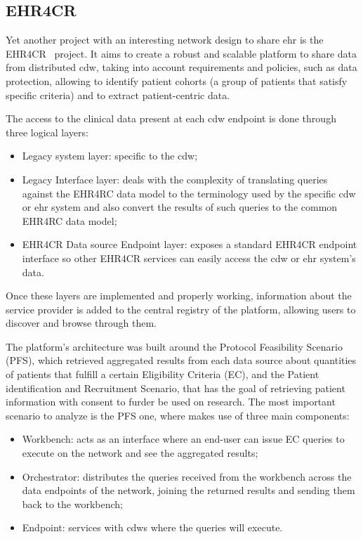 \subsection*{EHR4CR}
Yet another project with an interesting network design to share \gls{ehr} is the EHR4CR~\cite{ehr4cr} project.
It aims to create a robust and scalable platform to share data from distributed \gls{cdw}, taking into account requirements and policies, such as data protection, allowing to identify patient cohorts (a group of patients that satisfy specific criteria) and to extract patient-centric data.

The access to the clinical data present at each \gls{cdw} endpoint is done through three logical layers:
\begin{itemize}
    \item Legacy system layer: specific to the \gls{cdw};
    \item Legacy Interface layer: deals with the complexity of translating queries against the EHR4RC data model to the terminology used by the specific \gls{cdw} or \gls{ehr} system and also convert the results of such queries to the common EHR4RC data model;
    \item EHR4CR Data source Endpoint layer: exposes a standard EHR4CR endpoint interface so other EHR4CR services can easily access the \gls{cdw} or \gls{ehr} system's data.
\end{itemize}
Once these layers are implemented and properly working, information about the service provider is added to the central registry of the platform, allowing users to discover and browse through them.

The platform's architecture was built around the Protocol Feasibility Scenario (PFS), which retrieved aggregated results from each data source about quantities of patients that fulfill a certain Eligibility Criteria (EC), and the Patient identification and Recruitment Scenario, that has the goal of retrieving patient information with consent to furder be used on research.
The most important scenario to analyze is the PFS one, where makes use of three main components:
\begin{itemize}
    \item Workbench: acts as an interface where an end-user can issue EC queries to execute on the network and see the aggregated results;
    \item Orchestrator: distributes the queries received from the workbench across the data endpoints of the network, joining the returned results and sending them back to the workbench;
    \item Endpoint: services with \gls{cdw}s where the queries will execute.
\end{itemize}

